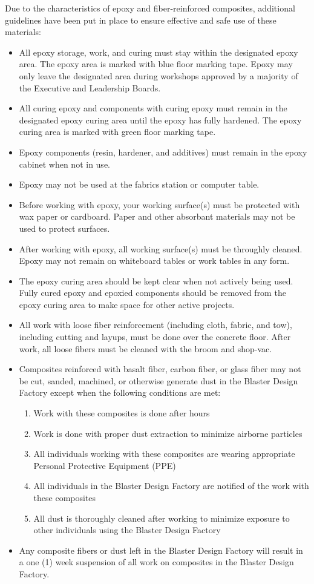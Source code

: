 \documentclass[12pt,letterpaper]{article}
\begin{document}
Due to the characteristics of epoxy and fiber-reinforced composites, additional guidelines have been put in place to ensure effective and safe use of these materials:
\begin{itemize}
    \item All epoxy storage, work, and curing must stay within the designated epoxy area. The epoxy area is marked with blue floor marking tape. Epoxy may only leave the designated area during workshops approved by a majority of the Executive and Leadership Boards.
    \item All curing epoxy and components with curing epoxy must remain in the designated epoxy curing area until the epoxy has fully hardened. The epoxy curing area is marked with green floor marking tape.
    \item Epoxy components (resin, hardener, and additives) must remain in the epoxy cabinet when not in use.
    \item Epoxy may not be used at the fabrics station or computer table.
    \item Before working with epoxy, your working surface(s) must be protected with wax paper or cardboard. Paper and other absorbant materials may not be used to protect surfaces.
    \item After working with epoxy, all working surface(s) must be throughly cleaned. Epoxy may not remain on whiteboard tables or work tables in any form.
    \item The epoxy curing area should be kept clear when not actively being used. Fully cured epoxy and epoxied components should be removed from the epoxy curing area to make space for other active projects. 
    \item All work with loose fiber reinforcement (including cloth, fabric, and tow), including cutting and layups, must be done over the concrete floor. After work, all loose fibers must be cleaned with the broom and shop-vac. 
    \item Composites reinforced with basalt fiber, carbon fiber, or glass fiber may not be cut, sanded, machined, or otherwise generate dust in the Blaster Design Factory except when the following conditions are met:
    \begin{enumerate}
        \item Work with these composites is done after hours
        \item Work is done with proper dust extraction to minimize airborne particles
        \item All individuals working with these composites are wearing appropriate Personal Protective Equipment (PPE)
        \item All individuals in the Blaster Design Factory are notified of the work with these composites
        \item All dust is thoroughly cleaned after working to minimize exposure to other individuals using the Blaster Design Factory
    \end{enumerate}
    \item Any composite fibers or dust left in the Blaster Design Factory will result in a one (1) week suspension of all work on composites in the Blaster Design Factory.
\end{itemize}
\end{document}
